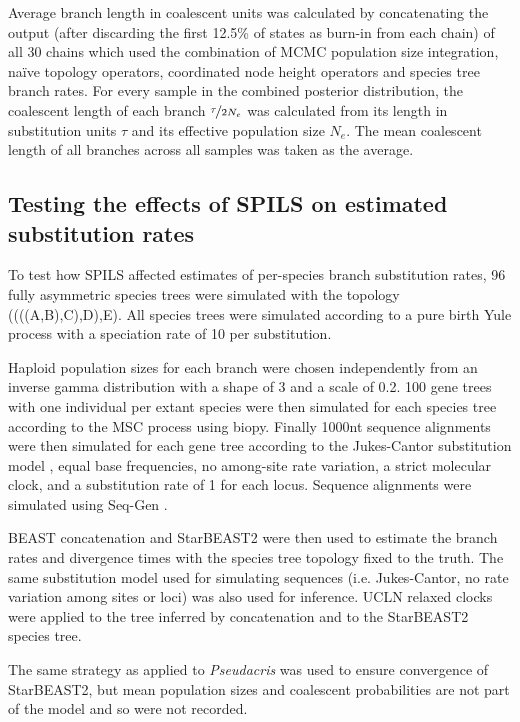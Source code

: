 \documentclass[nogrid]{MBE}%
\begin{document}
Average branch length in coalescent units was calculated by concatenating the
output (after discarding the first 12.5\% of states as burn-in from each
chain) of all 30 chains which used the combination of MCMC population size
integration, na\"ive topology operators, coordinated node height operators and
species tree branch rates. For every sample in the combined posterior
distribution, the coalescent length of each branch $\nicefrac{\tau}{2N_e}$ was
calculated from its length in substitution units $\tau$ and its effective
population size $N_e$. The mean coalescent length of all branches across all
samples was taken as the average.

\subsection{Testing the effects of SPILS on estimated substitution rates}

To test how SPILS affected estimates of per-species branch substitution rates,
96 fully asymmetric species trees were simulated with the topology
((((A,B),C),D),E). All species trees were simulated according to a pure birth Yule
process \citep{Yule21} with a speciation rate of 10 per substitution.

Haploid population sizes for each branch were chosen independently from an
inverse gamma distribution with a shape of 3 and a scale of 0.2. 100 gene trees
with one individual per extant species were then simulated for each species tree
according to the MSC process using biopy. Finally 1000nt sequence alignments
were then simulated for each gene tree according to the Jukes-Cantor
substitution model \citep{JUKES196921}, equal base frequencies, no among-site
rate variation, a strict molecular clock, and a substitution rate of 1 for each
locus. Sequence alignments were simulated using Seq-Gen \citep{Rambaut01061997}.

BEAST concatenation and StarBEAST2 were then used to estimate the branch rates
and divergence times with the species tree topology fixed to the truth. The same
substitution model used for simulating sequences (i.e. Jukes-Cantor, no rate
variation among sites or loci) was also used for inference. UCLN relaxed
clocks were applied to the tree inferred by concatenation and to the
StarBEAST2 species tree.

The same strategy as applied to \textit{Pseudacris} was used to ensure
convergence of StarBEAST2, but mean population sizes and coalescent
probabilities are not part of the model and so were not recorded.
\end{document}
